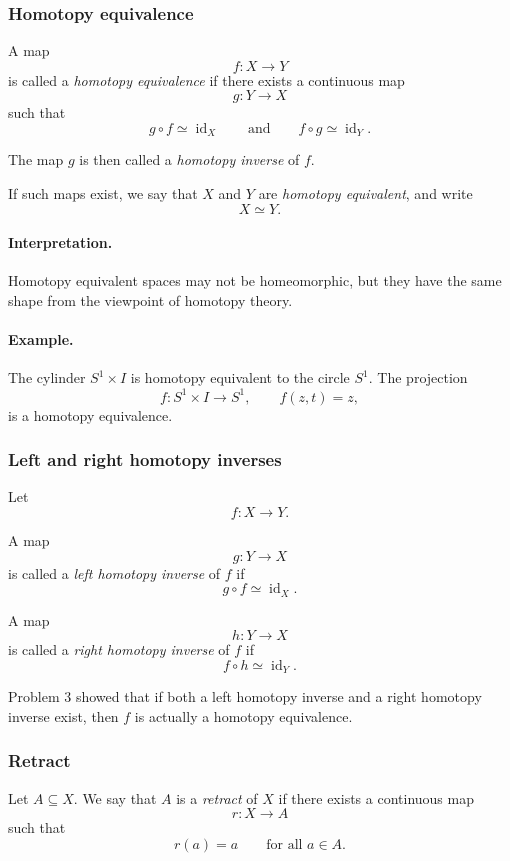 \documentclass[12pt,a4paper]{article}
\theoremstyle{notespace}
\begin{document}
\subsubsection{Homotopy equivalence}

A map
\[
f:X\to Y
\]
is called a \emph{homotopy equivalence} if there exists a continuous map
\[
g:Y\to X
\]
such that
\[
g\circ f \simeq \operatorname{id}_X
\qquad\text{and}\qquad
f\circ g \simeq \operatorname{id}_Y.
\]

The map \(g\) is then called a \emph{homotopy inverse} of \(f\).

If such maps exist, we say that \(X\) and \(Y\) are \emph{homotopy equivalent}, and write
\[
X\simeq Y.
\]

\paragraph{Interpretation.}
Homotopy equivalent spaces may not be homeomorphic, but they have the same shape from the viewpoint of homotopy theory.

\paragraph{Example.}
The cylinder \(S^1\times I\) is homotopy equivalent to the circle \(S^1\).  
The projection
\[
f:S^1\times I\to S^1,
\qquad
f(z,t)=z,
\]
is a homotopy equivalence.

\subsubsection{Left and right homotopy inverses}

Let
\[
f:X\to Y.
\]

A map
\[
g:Y\to X
\]
is called a \emph{left homotopy inverse} of \(f\) if
\[
g\circ f \simeq \operatorname{id}_X.
\]

A map
\[
h:Y\to X
\]
is called a \emph{right homotopy inverse} of \(f\) if
\[
f\circ h \simeq \operatorname{id}_Y.
\]

Problem \(3\) showed that if both a left homotopy inverse and a right homotopy inverse exist, then \(f\) is actually a homotopy equivalence.

\subsubsection{Retract}

Let \(A\subseteq X\). We say that \(A\) is a \emph{retract} of \(X\) if there exists a continuous map
\[
r:X\to A
\]
such that
\[
r(a)=a
\qquad
\text{for all }a\in A.
\]
\end{document}
